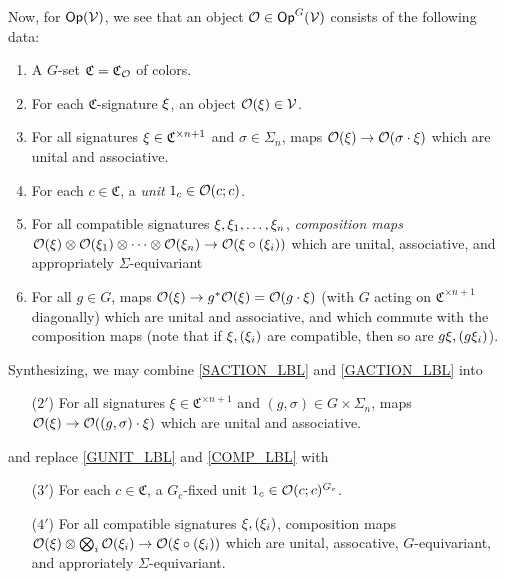 \documentclass[a4paper,10pt
,draft
]{article}%
\renewcommand{\1}{\eta}%
\begin{document}
\begin{example}
      Now, for $\mathsf{Op}(\mathcal V)$,
      we see that an object $\mathcal{O} \in \mathsf{Op}^G(\mathcal V)$ consists of the following data:
      \begin{enumerate}[label = (\arabic*), start = 0]
      \item A $G$-set $\mathfrak C = \mathfrak C_{\mathcal{O}}$ of colors.
      \item For each $\mathfrak C$-signature $\xi$, an object $\mathcal{O}(\xi) \in \mathcal V$.
      \item \label{SACTION_LBL}
            For all signatures $\xi \in \mathfrak C^{\times n + 1}$ and $\sigma \in \Sigma_n$,
            maps $\mathcal{O}(\xi) \to \mathcal{O}(\sigma \cdot \xi)$
            which are unital and associative.
      \item \label{GUNIT_LBL} 
            For each $c \in \mathfrak{C}$, a \textit{unit} $1_c \in \mathcal{O}(c;c)$.
      \item \label{COMP_LBL}
            For all compatible signatures $\xi, \xi_1,\dots, \xi_n$,
            \textit{composition maps} $\mathcal{O}(\xi) \otimes \mathcal{O}(\xi_1) \otimes \dots \otimes \mathcal{O}(\xi_n) \to \mathcal{O}(\xi \circ (\xi_i))$
            which are unital, associative, and appropriately $\Sigma$-equivariant
      \item \label{GACTION_LBL}
            For all $g \in G$, maps $\O(\ksi) \to g^{\**}\O(\ksi) = \O(g \cdot \ksi)$
            (with $G$ acting on $\mathfrak C^{\times n+1}$ diagonally)
            which are unital and associative, and which commute with the composition maps
            (note that if $\xi, (\xi_i)$ are compatible, then so are $g \xi, (g \xi_i)$).
      \end{enumerate}
      Synthesizing, we may combine \ref{SACTION_LBL} and \ref{GACTION_LBL} into
      \begin{enumerate}
      \item[($2'$)] For all signatures $\xi \in \mathfrak C^{\times n+1}$ and $(g,\sigma) \in G\times \Sigma_n$, maps
            $\mathcal{O}(\xi) \to \mathcal{O}((g,\sigma)\cdot \xi)$
            which are unital and associative.
      \end{enumerate}
      
      and replace \ref{GUNIT_LBL} and \ref{COMP_LBL} with
      \begin{enumerate}
      \item[($3'$)] For each $c \in \mathfrak C$, a $G_c$-fixed unit $1_c \in \mathcal{O}(c;c)^{G_c}$.
      \item[($4'$)] For all compatible signatures $\xi, (\xi_i)$,
            composition maps $\mathcal{O}(\xi) \otimes \bigotimes_i \mathcal{O}(\xi_i) \to \mathcal{O}(\xi \circ (\xi_i))$
            which are unital, assocative, $G$-equivariant, and approriately $\Sigma$-equivariant.
      \end{enumerate}
\end{example}
\end{document}
